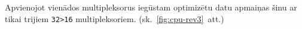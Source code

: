 Apvienojot vienādos multipleksorus iegūstam optimizētu datu apmaiņas šinu
ar tikai trijiem \texttt{32>16} multipleksoriem. (sk.~\ref{fig:cpu-rev3}~att.)

